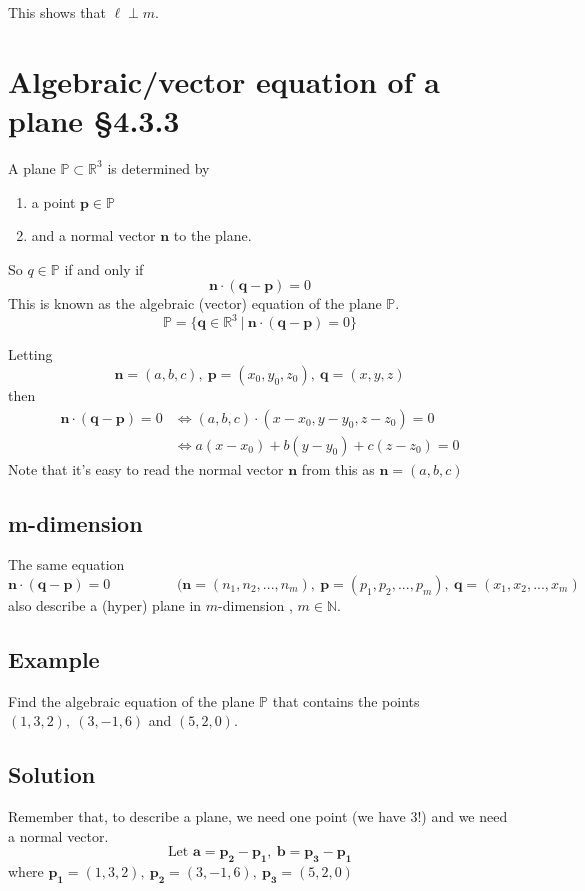 \documentclass[11pt]{article}
\newcommand{\naturals}{\mathbb{N}}
\newcommand{\reals}{\mathbb{R}}
\newcommand{\plane}{\mathbb{P}}
\renewcommand{\vec}[1]{\mathbf{#1}}
\begin{document}
This shows that $\ell \perp m$.

\section{Algebraic/vector equation of a plane §4.3.3}
A plane $\plane \subset \reals^3$ is determined by
\begin{enumerate}[ (i) ]
\item a point $\vec{p} \in \plane$
\item and a normal vector $\vec{n}$ to the plane.
\end{enumerate}

So $q \in \plane$ if and only if
\[ \vec{n} \cdot (\vec{q} - \vec{p}) = 0 \]
This is known as the algebraic (vector) equation of the plane $\plane$.
\[ \plane = \{ \vec{q} \in \reals^3\ |\ \vec{n} \cdot (\vec{q} - \vec{p}) = 0 \} \]

Letting
\[ \vec{n} = (a, b, c),\ \vec{p} = (x_0, y_0, z_0),\ \vec{q} = (x, y, z) \]
then
\begin{align*}
\vec{n} \cdot (\vec{q} - \vec{p}) = 0 &\Leftrightarrow (a, b, c) \cdot (x-x_0, y-y_0, z-z_0) = 0 \\
&\Leftrightarrow a(x-x_0) + b(y-y_0) + c(z-z_0) = 0
\end{align*}
Note that it's easy to read the normal vector $\vec{n}$ from this as $\vec{n}=(a,b,c)$

\subsection{m-dimension}
The same equation
\[ \vec{n} \cdot (\vec{q} - \vec{p}) = 0 \hspace{2cm} (\vec{n} = (n_1, n_2, ..., n_m),\ \vec{p} = (p_1, p_2, ..., p_m),\ \vec{q} = (x_1, x_2, ..., x_m) \]
also describe a (hyper) plane in $m$-dimension	, $m \in \naturals$.

\subsection{Example}
Find the algebraic equation of the plane $\plane$ that contains the points $(1, 3, 2),\ (3, -1, 6)$ and $(5, 2, 0)$.

\subsection{Solution}
Remember that, to describe a plane, we need one point (we have 3!) and we need a normal vector.
\[ \text{Let } \vec{a} = \vec{p_2} -\vec{p_1},\ \vec{b} = \vec{p_3} - \vec{p_1} \]
where $\vec{p_1}=(1, 3, 2),\ \vec{p_2}=(3, -1, 6),\ \vec{p_3}=(5, 2, 0)$
\end{document}
